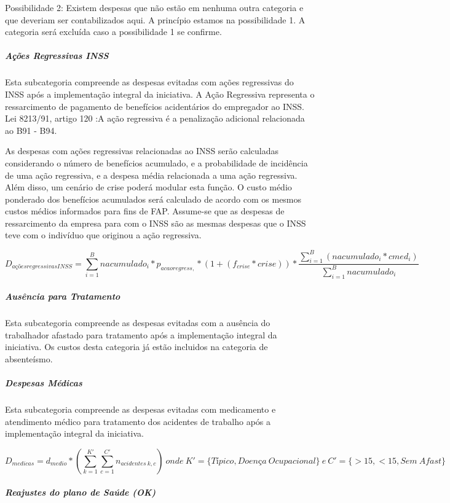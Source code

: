 \documentclass[]{article}
\let\oldsubparagraph\subparagraph
\renewcommand{\subparagraph}[1]{\oldsubparagraph{#1}\mbox{}}
\begin{document}
Possibilidade 2: Existem despesas que não estão em nenhuma outra
categoria e que deveriam ser contabilizados aqui. A princípio estamos na
possibilidade 1. A categoria será excluída caso a possibilidade 1 se
confirme.

\subparagraph{Ações Regressivas INSS}\label{acoes-regressivas-inss}

Esta subcategoria compreende as despesas evitadas com ações regressivas
do INSS após a implementação integral da iniciativa. A Ação Regressiva
representa o ressarcimento de pagamento de benefícios acidentários do
empregador ao INSS. Lei 8213/91, artigo 120 :A ação regressiva é a
penalização adicional relacionada ao B91 - B94.

As despesas com ações regressivas relacionadas ao INSS serão calculadas
considerando o número de benefícios acumulado, e a probabilidade de
incidência de uma ação regressiva, e a despesa média relacionada a uma
ação regressiva. Além disso, um cenário de crise poderá modular esta
função. O custo médio ponderado dos benefícios acumulados será calculado
de acordo com os mesmos custos médios informados para fins de FAP.
Assume-se que as despesas de ressarcimento da empresa para com o INSS
são as mesmas despesas que o INSS teve com o indivíduo que originou a
ação regressiva.

\[D_{ações regressivas INSS} =  \sum_{i=1}^{B} nacumulado_i * p_{acaoregress,} * (1+(f_{crise}*crise))  * \frac{\sum_{i=1}^{B} (nacumulado_i *cmed_{i})}{\sum_{i=1}^{B} nacumulado_i} \]

\subparagraph{Ausência para Tratamento}\label{ausencia-para-tratamento}

Esta subcategoria compreende as despesas evitadas com a ausência do
trabalhador afastado para tratamento após a implementação integral da
iniciativa. Os custos desta categoria já estão incluidos na categoria de
absenteísmo.

\subparagraph{Despesas Médicas}\label{despesas-medicas}

Esta subcategoria compreende as despesas evitadas com medicamento e
atendimento médico para tratamento dos acidentes de trabalho após a
implementação integral da iniciativa.

\[D_{medicas} = d_{medio} * (\sum_{k=1}^{K'} {\sum_{c=1}^{C'} {n_{acidentes \ k,c}}}) \ onde \  K' = \{{Típico},{Doença\ Ocupacional}\} \ e \ C' = \{{>15},<15,Sem\ Afast\}\]

\subparagraph{Reajustes do plano de Saúde
(OK)}\label{reajustes-do-plano-de-saude-ok}
\end{document}
